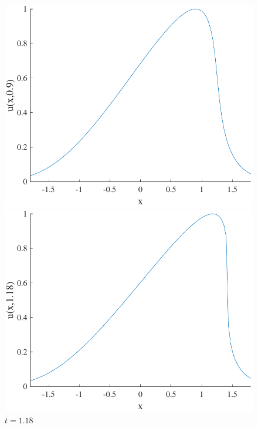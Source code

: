 \documentclass{article}
\begin{document}
\begin{figure}[H]
\begin{minipage}[b]{0.49\textwidth}
  \end{minipage}
    \hfill
  \begin{minipage}[b]{0.49\textwidth}
    \includegraphics[width=\textwidth]{hw_13_plot4.pdf}
    \caption{$t = 0.9$}

  \end{minipage}
    \hfill
  \begin{minipage}[b]{0.49\textwidth}
    \includegraphics[width=\textwidth]{hw_13_plot5.pdf}
    \caption{$t = 1.18$}

  \end{minipage}
\end{figure}
\end{document}
